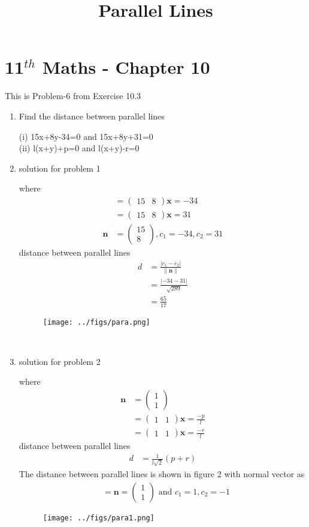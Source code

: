 \documentclass[12pt]{article}
\providecommand{\abs}[1]{\left\vert#1\right\vert}
\providecommand{\norm}[1]{\left\lVert#1\right\rVert}
\newcommand{\myvec}[1]{\ensuremath{\begin{pmatrix}#1\end{pmatrix}}}
\let\vec\mathbf
\begin{document}
\begin{center}
\title{\textbf{Parallel Lines}}
\date{\vspace{-5ex}} %
\maketitle
\end{center}
\setcounter{page}{1}
\section*{11$^{th}$ Maths - Chapter 10}
This is Problem-6 from Exercise 10.3
\begin{enumerate}
	\item Find the distance between parallel lines 
	
(i) 15x+8y-34=0 and  15x+8y+31=0 \\
(ii) l(x+y)+p=0 and  l(x+y)-r=0
\	
\item solution for problem 1

where
\begin{align}
&=\myvec{15&8}\vec{x}=-34\\ 
&=\myvec{15&8}\vec{x}=31\\
\vec{n}&=\myvec{15\\8},c_1=-34, c_2= 31
\end{align} 
distance between parallel lines 
\begin{align}
d&=\frac{\abs{c_1-c_2}}{\norm{\vec{n}}}\\
&=\frac{\abs{-34-31}}{\sqrt{289}}\\
&=\frac{65}{17}
\end{align}
\begin{figure}[h!]
\centering
\texttt{[image: ../figs/para.png]}
\caption{}
\label{fig:para.png}
\end{figure}
\
	\item solution for problem 2
	
 where
\begin{align}
\vec{n}&=\myvec{1\\1}\\
&=\myvec{1&1}\vec{x}=\frac{-p}{l}\\ 
&=\myvec{1&1}\vec{x}=\frac{-r}{l}		
\end{align}
distance between parallel lines 
\begin{align}
d&=\frac{1}{l\sqrt{2}}(p+r)
\end{align}	
The distance between parallel lines 
is shown in figure 2  with normal vector as 
\begin{align*}
&=\vec{n} =\myvec{1\\1} \text{ and }c_1=1,c_2=-1
\end{align*}
\begin{figure}[h!]
\centering
\texttt{[image: ../figs/para1.png]}
\caption{}
\label{fig:para1.png}
\end{figure}
\end{enumerate}
\end{document}
